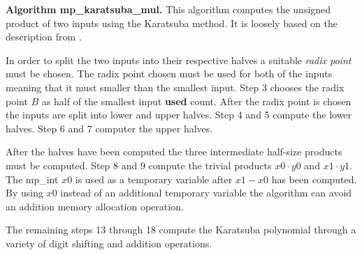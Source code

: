\documentclass[b5paper]{book}
\begin{document}
\textbf{Algorithm mp\_karatsuba\_mul.}
This algorithm computes the unsigned product of two inputs using the Karatsuba method.  It is loosely based on the description
from \cite[pp. 294-295]{TAOCPV2}.  

In order to split the two inputs into their respective halves a suitable \textit{radix point} must be chosen.  The radix point chosen must
be used for both of the inputs meaning that it must smaller than the smallest input.  Step 3 chooses the radix point $B$ as half of the 
smallest input \textbf{used} count.  After the radix point is chosen the inputs are split into lower and upper halves.  Step 4 and 5 
compute the lower halves.  Step 6 and 7 computer the upper halves.  

After the halves have been computed the three intermediate half-size products must be computed.  Step 8 and 9 compute the trivial products
$x0 \cdot y0$ and $x1 \cdot y1$.  The mp\_int $x0$ is used as a temporary variable after $x1 - x0$ has been computed.  By using $x0$ instead
of an additional temporary variable the algorithm can avoid an addition memory allocation operation.

The remaining steps 13 through 18 compute the Karatsuba polynomial through a variety of digit shifting and addition operations.
\end{document}
